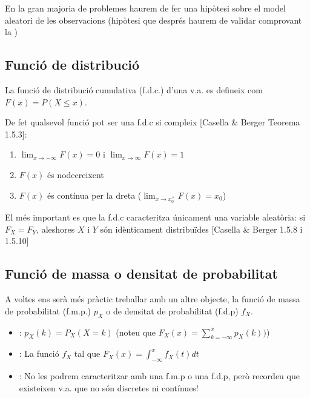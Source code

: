 \documentclass[letterpaper,10pt,english]{sphinxmanual}
\begin{document}
En la gran majoria de problemes haurem de fer una hipòtesi sobre el model aleatori de les observacions (hipòtesi que després haurem de validar comprovant la )


\subsection{Funció de distribució}
\label{\detokenize{0_Intro/0_1_Repas_probabilitat:funcio-de-distribucio}}
 La funció de distribució cumulativa (f.d.c.) d’una v.a. es defineix com \(F\left(x\right) = P\left(X \leq x\right)\).

De fet qualsevol funció pot ser una f.d.c si compleix {[}Casella \& Berger Teorema 1.5.3{]}:
\begin{enumerate}
%
\item {} 
\(\lim_{x\to -\infty} F(x) = 0\) i \(\lim_{x\to \infty} F(x) = 1\)

\item {} 
\(F(x)\) és no\sphinxhyphen{}decreixent

\item {} 
\(F(x)\) és contínua per la dreta (\(\lim_{x\to x_0^+} F(x) = x_0\))

\end{enumerate}

El més important es que la f.d.c caracteritza únicament una variable aleatòria: si \(F_X = F_Y\), aleshores \(X\) i \(Y\) són idènticament distribuïdes {[}Casella \& Berger 1.5.8 i 1.5.10{]}


\subsection{Funció de massa o densitat de probabilitat}
\label{\detokenize{0_Intro/0_1_Repas_probabilitat:funcio-de-massa-o-densitat-de-probabilitat}}
A voltes ens serà més pràctic treballar amb un altre objecte, la funció de massa de probabilitat (f.m.p.) \(p_X\) o de densitat de probabilitat (f.d.p) \(f_X\).
\begin{itemize}
\item {} 
: \(p_X\left(k\right) = P_X\left(X=k\right)\) (noteu que \(F_X\left(x\right) = \sum_{k=-\infty}^{x}p_X\left(k\right))\))

\item {} 
: La funció \(f_X\) tal que \(F_X\left(x\right) = \int_{-\infty}^x f_X\left(t\right)dt\)

\item {} 
:  No les podrem caracteritzar amb una f.m.p o una f.d.p, però recordeu que existeixen v.a. que no són discretes ni contínues!

\end{itemize}
\end{document}
